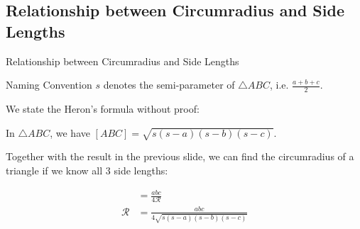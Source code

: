 \documentclass{beamer}
\begin{document}
\subsection{Relationship between Circumradius and Side Lengths}
\begin{frame}{Relationship between Circumradius and Side Lengths}
	\begin{center}
		\begin{minipage}{0.9\textwidth}
			\begin{exampleblock}{Naming Convention}
				$s$ denotes the semi-parameter of $\triangle ABC$, i.e. $\frac{a+b+c}{2}$.
			\end{exampleblock}
			We state the Heron's formula without proof:
			\begin{theorem}
				In $\triangle ABC$, we have $[ABC] = \sqrt{s(s-a)(s-b)(s-c)}$.
			\end{theorem}
			Together with the result in the previous slide, we can find the circumradius of a triangle if we know all $3$ side lengths:
			\begin{theorem}
				\begin{align*}
					[ABC] &= \tfrac{abc}{4\mathcal{R}} \\
					\mathcal{R} &= \tfrac{abc}{4\sqrt{s(s-a)(s-b)(s-c)} }
				\end{align*}
			\end{theorem}
		\end{minipage}
	\end{center}
\end{frame}
\end{document}
